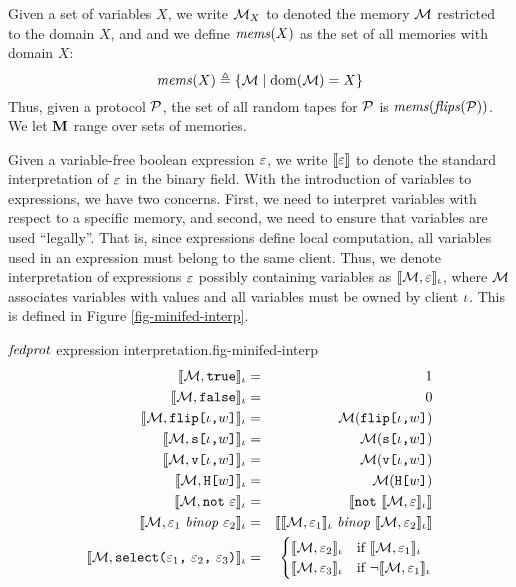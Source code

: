 Given a set of variables $X$, we write $\mathcal{M}_X$ to denoted the
memory $\mathcal{M}$ restricted to the domain $X$, and and we define
$\mathit{mems}(X)$ as the set of all memories with domain $X$:
$$
\mathit{mems}(X) \triangleq \{ \mathcal{M} \mid \mathrm{dom}(\mathcal{M}) = X \}
$$
Thus, given a protocol $\mathcal{P}$, the set of all random tapes for
$\mathcal{P}$ is $\mathit{mems}(\mathit{flips}(\mathcal{P}))$. We let $\mathbf{M}$ range
over sets of memories.

Given a variable-free boolean expression $\varepsilon$, we write $\llbracket \varepsilon \rrbracket$
to denote the standard interpretation of $\varepsilon$ in the binary field.
With the introduction of variables to expressions, we have two
concerns. First, we need to interpret variables with respect to a
specific memory, and second, we need to ensure that variables are used
``legally''. That is, since expressions define local computation, all
variables used in an expression must belong to the same client.  Thus,
we denote interpretation of expressions $\varepsilon$ possibly containing
variables as $\llbracket \mathcal{M},\varepsilon \rrbracket_{\iota}$, where $\mathcal{M}$ associates
variables with values and all variables must be owned by client
$\iota$. This is defined in Figure \ref{fig-minifed-interp}.

\begin{fpfig}[t]{$\mathit{fedprot}$ expression interpretation.}{fig-minifed-interp}
\begin{eqnarray*}
\lcod{\store, \etrue}{\cid} &=& 1\\
\lcod{\store, \efalse}{\cid} &=& 0\\
\lcod{\store, \flip{\cid}{w}}{\cid} &=& \store(\flip{\cid}{w})\\
\lcod{\store, \secret{\cid}{w}}{\cid} &=& \store(\secret{\cid}{w})\\
\lcod{\store, \view{\cid}{w}}{\cid} &=& \store(\view{\cid}{w})\\
\lcod{\store, \oracle{w}}{\cid} &=& \store(\oracle{w})\\
\lcod{\store, \enot\ \be}{\cid} &=& \cod{\enot\ \lcod{\store,\be}{\cid}}\\
\lcod{\store, \be_1\ \mathit{binop}\ \be_2}{\cid} &=&
    \cod{\lcod{\store,\be_1}{\cid}\ \mathit{binop}\ \lcod{\store,\be_2}{\cid}}\\
\lcod{\store, \select{\be_1}{\be_2}{\be_3}}{\cid} &=&
             \begin{cases}
                \lcod{\store,\be_2}{\cid} & \text{if\ } \lcod{\store,\be_1}{\cid}\\
                \lcod{\store,\be_3}{\cid} & \text{if\ } \neg\lcod{\store,\be_1}{\cid}
             \end{cases}%
\end{eqnarray*}
\end{fpfig}

